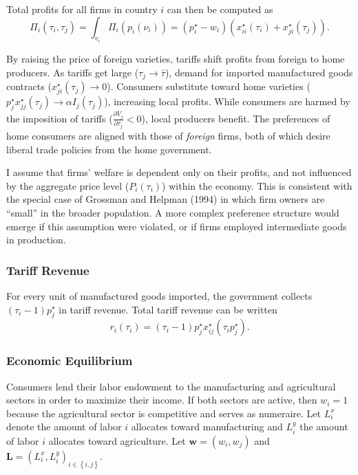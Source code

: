 \documentclass{puthesis}
\begin{document}
Total profits for all firms in country \(i\) can then be computed as
\begin{equation} \label{eq:PiStar}
\Pi_i(\tau_i, \tau_j) = \int_{v_i} \Pi_i(p_i(\nu_i)) = (p_i^\star - w_i) \left( x_{ii}^\star(\tau_i) + x_{ji}^\star(\tau_j) \right) .
\end{equation}

By raising the price of foreign varieties, tariffs shift profits from
foreign to home producers. As tariffs get large
(\(\tau_j \rightarrow \bar{\tau}\)), demand for imported manufactured
goods contracts (\(x_{ji}^\star(\tau_j) \rightarrow 0\)). Consumers
substitute toward home varieties
(\(p_j^\star x_{jj}^\star(\tau_j) \rightarrow \alpha I_j(\tau_j)\)),
increasing local profits. While consumers are harmed by the imposition
of tariffs (\(\frac{\partial V_j}{\partial \tau_j} < 0\)), local
producers benefit. The preferences of home consumers are aligned with
those of \emph{foreign} firms, both of which desire liberal trade
policies from the home government.

I assume that firms' welfare is dependent only on their profits, and not
influenced by the aggregate price level (\(P_i(\tau_i)\)) within the
economy. This is consistent with the special case of Grossman and
Helpman (1994) in which firm owners are ``small'' in the broader
population. A more complex preference structure would emerge if this
assumption were violated, or if firms employed intermediate goods in
production.

\subsubsection{Tariff Revenue}

For every unit of manufactured goods imported, the government collects
\((\tau_{i} - 1) p_j^\star\) in tariff revenue. Total tariff revenue can
be written \begin{equation} \label{eq:revenue}
r_i(\tau_i) = (\tau_i - 1) p_j^\star x_{ij}^\star(\tau_i p_j^\star) .
\end{equation}

\subsubsection{Economic Equilibrium}

Consumers lend their labor endowment to the manufacturing and
agricultural sectors in order to maximize their income. If both sectors
are active, then \(w_i = 1\) because the agricultural sector is
competitive and serves as numeraire. Let \(L_i^x\) denote the amount of
labor \(i\) allocates toward manufacturing and \(L_i^y\) the amount of
labor \(i\) allocates toward agriculture. Let
\(\bm{w} = \left( w_i, w_j \right)\) and
\(\bm{L} = \left( L_i^x, L_i^y \right)_{ i \in \left\{ i, j \right\} }\).
\end{document}
